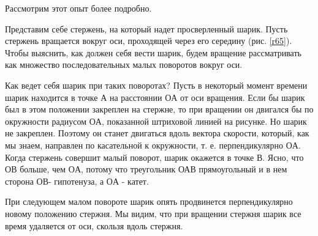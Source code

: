\documentclass[a6paper, 11pt]{diss_4}
\renewcommand{\'}{\,'}
\begin{document}
  Рассмотрим этот опыт более подробно.

  Представим себе стержень, на который надет просверленный шарик. Пусть
стержень вращается вокруг оси, проходящей через его середину (рис. \ref{r65}). Чтобы
выяснить, как должен себя вести шарик, будем вращение рассматривать как
множество последовательных малых поворотов вокруг оси.

  Как ведет себя шарик при таких поворотах? Пусть в некоторый момент
времени шарик находится в точке $А$ на расстоянии $ОА$ от оси вращения. Если бы
шарик был в этом положении закреплен на стержне, то при вращении он двигался бы
по окружности радиусом $ОА$, показанной штриховой линией на рисунке. Но шарик не
закреплен. Поэтому он станет двигаться вдоль вектора скорости, который, как мы
знаем, направлен по касательной к окружности, т. е. перпендикулярно $ОА$. Когда
стержень совершит малый поворот, шарик окажется в точке $В$. Ясно, что $ОВ$
больше, чем $ОА$, потому что треугольник ОАВ прямоугольный и в нем сторона $ОВ$-
гипотенуза, а $ОА$ - катет.

  При следующем малом повороте шарик опять продвинется перпендикулярно
новому положению стержня. Мы видим, что при вращении стержня шарик все время
удаляется от оси, скользя вдоль стержня.
\end{document}
